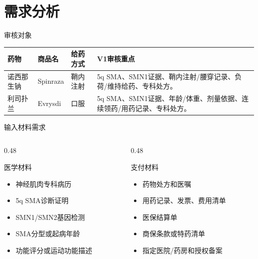\documentclass{beamer}
\begin{document}
\section{需求分析}
\begin{frame}[fragile]{审核对象}
\setlength{\tabcolsep}{8pt}
\renewcommand{\tabularxcolumn}[1]{m{#1}}
\begin{tabularx}{\textwidth}{
  >{\hsize=0.6\hsize}X
  >{\hsize=0.7\hsize}X
  >{\hsize=0.8\hsize}X
  >{\hsize=1.9\hsize}X
}
    \toprule
    药物 & 商品名 & 给药方式 & V1审核重点 \\
    \midrule
    诺西那生钠 & Spinraza & 鞘内注射 & 5q SMA、SMN1证据、鞘内注射/腰穿记录、负荷/维持给药、专科处方。 \\
    利司扑兰 & Evrysdi & 口服 & 5q SMA、SMN1证据、年龄/体重、剂量依据、连续领药/用药记录、专科处方。 \\
    \bottomrule
  \end{tabularx}
\end{frame}

\begin{frame}[fragile]{输入材料需求}
  \begin{columns}[T,onlytextwidth]
    \begin{column}{0.48\textwidth}
      \begin{block}{医学材料}
        \begin{itemize}
          \item 神经肌肉专科病历
          \item 5q SMA诊断证明
          \item SMN1/SMN2基因检测
          \item SMA分型或起病年龄
          \item 功能评分或运动功能描述
        \end{itemize}
      \end{block}
    \end{column}
    \begin{column}{0.48\textwidth}
      \begin{block}{支付材料}
        \begin{itemize}
          \item 药物处方和医嘱
          \item 用药记录、发票、费用清单
          \item 医保结算单
          \item 商保条款或特药清单
          \item 指定医院/药房和授权备案
        \end{itemize}
      \end{block}
    \end{column}
  \end{columns}
\end{frame}
\end{document}
